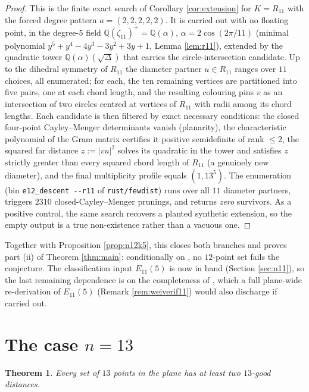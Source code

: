 \documentclass[11pt]{article}
\newtheorem{theorem}{Theorem}[section]
\theoremstyle{definition}
\theoremstyle{remark}
\newcommand{\Q}{\mathbb{Q}}
\begin{document}
\begin{proof}
This is the finite exact search of Corollary \ref{cor:extension} for $K = R_{11}$ with the
forced degree pattern $a = (2,2,2,2,2)$. It is carried out with no floating point, in the
degree-$5$ field $\Q(\zeta_{11})^+ = \Q(\alpha)$, $\alpha = 2\cos(2\pi/11)$ (minimal
polynomial $y^5 + y^4 - 4y^3 - 3y^2 + 3y + 1$, Lemma \ref{lem:r11}), extended by the
quadratic tower $\Q(\alpha)(\sqrt{\Delta})$ that carries the circle-intersection candidate.
Up to the dihedral symmetry of $R_{11}$ the diameter partner $u \in R_{11}$ ranges over
$11$ choices, all enumerated; for each, the ten remaining vertices are partitioned into
five pairs, one at each chord length, and the resulting colouring pins $v$ as an
intersection of two circles centred at vertices of $R_{11}$ with radii among its chord
lengths. Each candidate is then filtered by exact necessary conditions: the closed
four-point Cayley--Menger determinants vanish (planarity), the characteristic polynomial of
the Gram matrix certifies it positive semidefinite of rank $\le 2$, the squared far
distance $z := |vu|^2$ solves its quadratic in the tower and satisfies $z$ strictly greater
than every squared chord length of $R_{11}$ (a genuinely new diameter), and the final
multiplicity profile equals $(1, 13^5)$. The enumeration (bin \texttt{e12\_descent -{}-r11}
of \texttt{rust/fewdist}) runs over all $11$ diameter partners, triggers $2310$
closed-Cayley--Menger prunings, and returns \emph{zero} survivors. As a
positive control, the same search recovers a planted synthetic extension, so the empty
output is a true non-existence rather than a vacuous one.
\end{proof}

Together with Proposition \ref{prop:n12k5}, this closes both branches and proves part (ii)
of Theorem \ref{thm:main}: conditionally on \cite{Wei11}, no $12$-point set fails the
conjecture. The classification input $E_{11}(5)$ is now in hand (Section \ref{sec:n11}), so
the last remaining dependence is on the completeness of \cite[Theorem~13]{Wei11}, which a
full plane-wide re-derivation of $E_{11}(5)$ (Remark \ref{rem:weiverif11}) would also
discharge if carried out.

\section{The case $n = 13$}\label{sec:n13}

\begin{theorem}\label{thm:n13}
Every set of $13$ points in the plane has at least two $13$-good distances.
\end{theorem}
\end{document}
